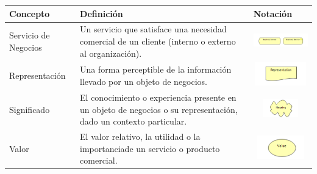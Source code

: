 \newpage
\begin{table}[H]
	\centering
	\begin{tabular}{| m{3cm} | m{7cm} | m{3.8cm} |}
		\hline
		\textbf{Concepto}           & \textbf{Definición} & \textbf{Notación} \\ \hline
		
		Servicio de Negocios     & Un servicio que satisface una necesidad comercial de un cliente (interno o externo al organización).        &\vspace{2mm}\includegraphics[width=40mm, height=8mm]{imgs/conceptos/negocio/Business_service.pdf}  \\ \hline
		
		Representación           & Una forma perceptible de la información llevado por un objeto de negocios.                                                                                                           &\vspace{1.52mm}  \includegraphics[width=40mm, height=10mm]{imgs/conceptos/negocio/Representation.pdf}            \\ \hline
		Significado              & El conocimiento o experiencia presente en un objeto de negocios o su representación, dado un contexto particular.                                                                   &\vspace{1.52mm}\includegraphics[width=40mm, height=8mm]{imgs/conceptos/negocio/Meaning.pdf}           \\ \hline
		
		Valor                    & El valor relativo, la utilidad o la importanciade un servicio o producto comercial.                                                                                                  
		&\vspace{1.52mm}\includegraphics[width=40mm, height=10mm]{imgs/conceptos/negocio/Value.pdf}        \\ \hline
		

\end{tabular}
\end{table}
